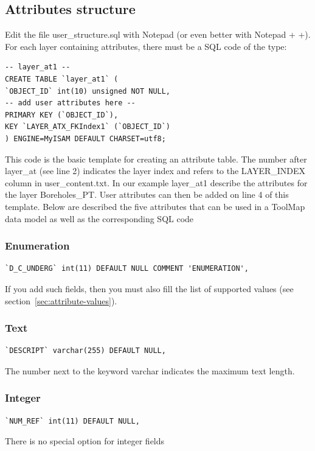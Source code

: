 \documentclass[a4paper, 12pt]{article}
\begin{document}
\subsection{Attributes structure}
Edit the file user\_structure.sql with Notepad (or even better with Notepad + +). For each layer containing attributes, there must be a SQL code of the type:

\begin{lstlisting}
-- layer_at1 --
CREATE TABLE `layer_at1` (
`OBJECT_ID` int(10) unsigned NOT NULL,
-- add user attributes here --
PRIMARY KEY (`OBJECT_ID`),
KEY `LAYER_ATX_FKIndex1` (`OBJECT_ID`)
) ENGINE=MyISAM DEFAULT CHARSET=utf8;
\end{lstlisting}
This code is the basic template for creating an attribute table. The number after layer\_at (see line 2) indicates the layer index and refers to the LAYER\_INDEX column in user\_content.txt. In our example layer\_at1 describe the attributes for the layer Boreholes\_PT. User attributes can then be added on line 4 of this template.
Below are described the five attributes that can be used in a ToolMap data model as well as the corresponding SQL code


\subsubsection {Enumeration}
\label{sec:enumeration}
\begin{lstlisting}
`D_C_UNDERG` int(11) DEFAULT NULL COMMENT 'ENUMERATION',
\end{lstlisting}
If you add such fields, then you must also fill the list of supported values (see section~\ref{sec:attribute-values}).
\subsubsection {Text}
\begin{lstlisting}
`DESCRIPT` varchar(255) DEFAULT NULL,
\end{lstlisting}
The number next to the keyword varchar indicates the maximum text length. 
\subsubsection {Integer}
\begin{lstlisting}
`NUM_REF` int(11) DEFAULT NULL,       
\end{lstlisting}
There is no special option for integer fields
\end{document}
